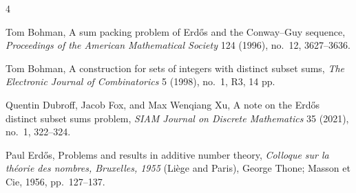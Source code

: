 \documentclass[reqno]{amsart}
\theoremstyle{remark}
\numberwithin{equation}{section}
\begin{document}
\begin{thebibliography}{4}

Tom Bohman, A sum packing problem of Erdős and the Conway--Guy sequence,
\emph{Proceedings of the American Mathematical Society} 124 (1996), no.~12, 3627--3636.

Tom Bohman, A construction for sets of integers with distinct subset sums,
\emph{The Electronic Journal of Combinatorics} 5 (1998), no.~1, R3, 14 pp.

Quentin Dubroff, Jacob Fox, and Max Wenqiang Xu, A note on the Erdős distinct subset sums problem,
\emph{SIAM Journal on Discrete Mathematics} 35 (2021), no.~1, 322--324.

Paul Erdős, Problems and results in additive number theory,
\emph{Colloque sur la théorie des nombres, Bruxelles, 1955} (Liège and Paris),
George Thone; Masson et Cie, 1956, pp.~127--137.

\end{thebibliography}
\end{document}
